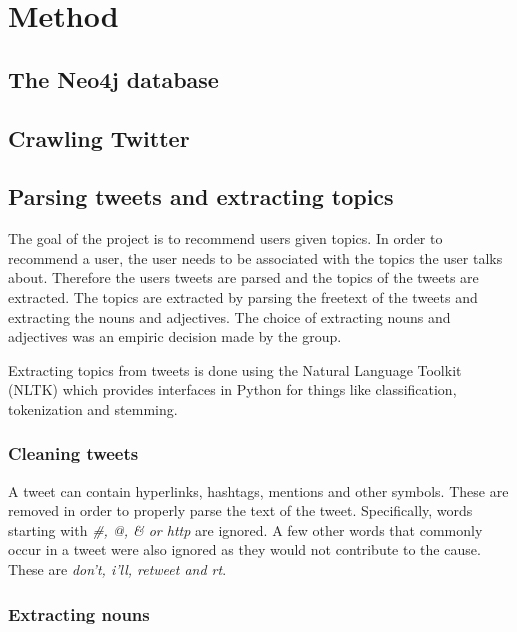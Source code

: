 \section{Method}
\label{sec:method}

\subsection{The Neo4j database}

\subsection{Crawling Twitter}

\subsection{Parsing tweets and extracting topics}

The goal of the project is to recommend users given topics. In order to
recommend a user, the user needs to be associated with the topics the user talks
about. Therefore the users tweets are parsed and the topics of the tweets are
extracted.  The topics are extracted by parsing the freetext of the tweets and
extracting the nouns and adjectives.  The choice of extracting nouns and
adjectives was an empiric decision made by the group.

Extracting topics from tweets is done using the Natural Language Toolkit (NLTK)
\cite{bird2006nltk} which provides interfaces in Python for things like
classification, tokenization and stemming.

\subsubsection{Cleaning tweets}

A tweet can contain hyperlinks, hashtags, mentions and other symbols. These are
removed in order to properly parse the text of the tweet. Specifically, words
starting with \textit{\#, @, \& or http} are ignored. A few other words that
commonly occur in a tweet were also ignored as they would not contribute to the
cause. These are \textit{don't, i'll, retweet and rt}.

\subsubsection{Extracting nouns}

